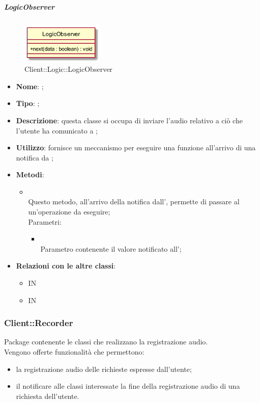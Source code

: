 \hypertarget{LogicObserver_label}{\subparagraph{LogicObserver}}
\begin{figure}[h]
	\centering
	\includegraphics[width=0.35\textwidth,height=\textheight,keepaspectratio]{images/ClassLogicObserver.png}
	\caption{Client::Logic::LogicObserver}
\end{figure}
\begin{itemize}
	\item \textbf{Nome}: ;
	\item \textbf{Tipo}: ;
	\item \textbf{Descrizione}: questa classe si occupa di inviare l'audio relativo a ciò che l'utente ha comunicato a ;
	\item \textbf{Utilizzo}: fornisce un meccanismo per eseguire una funzione all'arrivo di una notifica da ;
	\item \textbf{Metodi}:
	\begin{itemize}
		\item[]  \\		Questo metodo, all'arrivo della notifica dall', permette di passare al  un'operazione da eseguire;\\
		Parametri:
		\begin{itemize}
			\item {} \\
			Parametro contenente il valore notificato all';
		\end{itemize}
	\end{itemize}
	\item \textbf{Relazioni con le altre classi}:
	\begin{itemize}
		\item IN \hyperlink{SpeechEndObservable_label}{}
		\item IN \hyperlink{Logic_label}{}
	\end{itemize}
\end{itemize}
\FloatBarrier

\subsubsection{Client::Recorder}
Package contenente le classi che realizzano la registrazione audio.\\
Vengono offerte funzionalità che permettono:
\begin{itemize}
	\item la registrazione audio delle richieste espresse dall'utente;
	\item il notificare alle classi interessate la fine della registrazione audio di una richiesta dell'utente.
\end{itemize}

